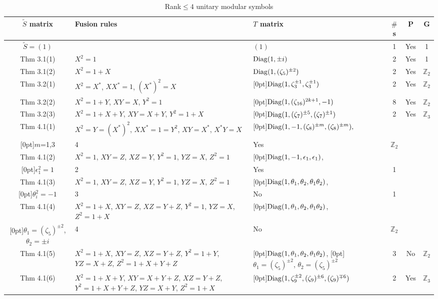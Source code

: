 \documentclass[12pt,psamsfonts]{amsart}
\newcommand{\e}{{\epsilon}}
\newcommand{\Z}{\mathbb Z}
\newcommand{\tS}{\tilde{S}}
\numberwithin{equation}{section}
\theoremstyle{definition}
\begin{document}
\begin{table}\caption{Rank$\leq4$ unitary modular symbols}\label{rank4ms}
\begin{tabular}{|c|p{4cm}|p{5cm}|c|c|c|}
\hline
$\tS$ matrix & Fusion rules & $T$ matrix & $\#$s & P & G\\
\hline\hline
$\tS=(1)$ &  & $(1)$ & 1 & Yes & 1\\
\hline
 Thm 3.1(1) & $X^2=1$ & $\operatorname{Diag}(1,\pm i)$  & 2 & Yes &1\\
\hline Thm 3.1(2) & $X^2=1+X$ & $\operatorname{Diag}(1,(\zeta_5)^{\pm 2})$ & 2  & Yes& $\Z_2$\\
\hline Thm 3.2(1) &\raggedright $X^2=X^*$, $XX^*=1$, $(X^*)^2=X$ & \raisebox{-1ex}[0pt]{$\operatorname{Diag}(1,\zeta_3^{\pm 1},\zeta_3^{\pm 1})$} & 2 & Yes& $\Z_2$\\
\hline Thm 3.2(2) &\raggedright $X^2=1+Y$, $XY=X$, $Y^2=1$ & \raisebox{-1ex}[0pt]{$\operatorname{Diag}(1,(\zeta_{16})^{2k+1},-1)$} & 8 & Yes& $\Z_2$\\
\hline Thm 3.2(3) &\raggedright $X^2=1+X+Y$, $XY=X+Y$, $Y^2=1+X$ & \raisebox{-1ex}[0pt]{$\operatorname{Diag}(1,(\zeta_7)^{\pm 5},(\zeta_7)^{\pm 1})$} & 2 & Yes& $\Z_3$\\
\hline Thm 4.1(1) &\raggedright $X^2=Y=(X^*)^2$, $XX^*=1=Y^2$, $XY=X^*$, $X^*Y=X$   &\raggedright \raisebox{-1ex}[0pt]{$\operatorname{Diag}(1,-1,(\zeta_8)^{\pm m},(\zeta_8)^{\pm m}),$} \\ \raisebox{-1ex}[0pt]{$m$=1,3}& 4 &Yes & $\Z_2$\\
\hline Thm 4.1(2) &\raggedright $X^2=1$, $XY=Z$, $XZ=Y$, $Y^2=1$,
$YZ=X$, $Z^2=1$ &
\raggedright \raisebox{-1ex}[0pt]{$\Diag(1,-1,\e_1,\e_1)$,} \\ \raisebox{-1ex}[0pt]{$\e_1^2=1$}  & 2 & Yes& 1\\
\hline Thm 4.1(3) &\raggedright $X^2=1$, $XY=Z$, $XZ=Y$, $Y^2=1$, $YZ=X$, $Z^2=1$ &  \raggedright
\raisebox{-1ex}[0pt]{$\operatorname{Diag}(1,\theta_1,\theta_2,\theta_1\theta_2)$,}\\ \raisebox{-1ex}[0pt]{$\theta_i^2=-1$} &3 & No& 1\\
\hline Thm 4.1(4) &\raggedright $X^2=1+X$, $XY=Z$, $XZ=Y+Z$, $Y^2=1$, $YZ=X$, $Z^2=1+X$ & \raggedright
\raisebox{-2ex}[0pt]{$\operatorname{Diag}(1,\theta_1,\theta_2,\theta_1\theta_2)$,}\\ \raisebox{-2ex}[0pt]{$\theta_1=(\zeta_5)^{\pm 2}$, $\theta_2=\pm i$} & 4 & No& $\Z_2$\\
\hline Thm 4.1(5) &\raggedright $X^2=1+X$, $XY=Z$, $XZ=Y+Z$, $Y^2=1+Y$, $YZ=X+Z$, $Z^2=1+X+Y+Z$ & \raggedright \raisebox{-3ex}[0pt]{$\operatorname{Diag}(1,\theta_1,\theta_2,\theta_1\theta_2)$,} \raisebox{-3ex}[0pt]{$\theta_1=(\zeta_5)^{\pm 2}$, $\theta_2=(\zeta_5)^{\pm 2}$} & 3 & No&$\Z_2$\\
\hline Thm 4.1(6) &\raggedright $X^2=1+X+Y$, $XY=X+Y+Z$, $XZ=Y+Z$,
$Y^2=1+X+Y+Z$, $YZ=X+Y$, $Z^2=1+X$ &\raggedright \raisebox{-4.5ex}[0pt]{$\operatorname{Diag}(1,\zeta_9^{\pm 2}, (\zeta_9)^{\pm 6},(\zeta_9)^{\mp 6})$} & 2 & Yes& $\Z_3$\\
\hline
\end{tabular}
\end{table}
\end{document}
